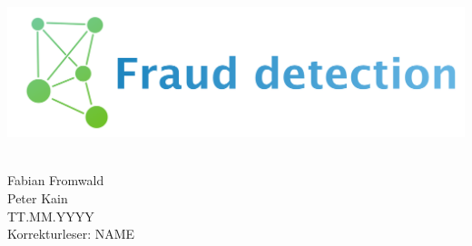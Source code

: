 \documentclass[a4page]{article}
\begin{document}
\begin{center}
\includegraphics[scale=0.9]{images/fraud_2.png}
\\[20pt]
\noindent\makebox[\linewidth]{\rule{\paperwidth}{0.5pt}}
\noindent\makebox[\linewidth]{\rule{\paperwidth}{0.5pt}}
\\[400pt]
\end{center}

\begin{Large}
\begin{flushleft}
Fabian Fromwald\\
Peter Kain\\
TT.MM.YYYY\\
Korrekturleser: NAME
\end{flushleft}
\end{Large}
\end{document}
